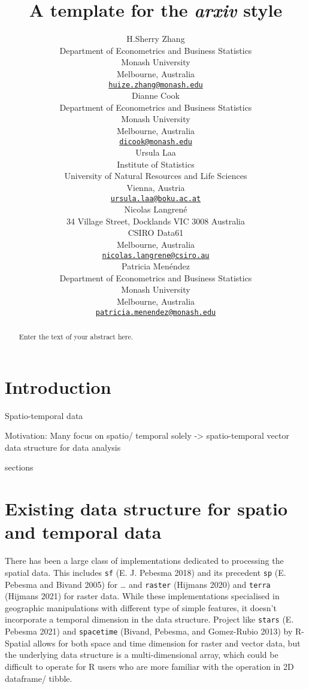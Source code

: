 \documentclass{article}
\title{A template for the \emph{arxiv} style}
\author{
    H.Sherry Zhang
   \\
    Department of Econometrics and Business Statistics \\
    Monash University \\
  Melbourne, Australia \\
  \texttt{\href{mailto:huize.zhang@monash.edu}{\nolinkurl{huize.zhang@monash.edu}}} \\
   \And
    Dianne Cook
   \\
    Department of Econometrics and Business Statistics \\
    Monash University \\
  Melbourne, Australia \\
  \texttt{\href{mailto:dicook@monash.edu}{\nolinkurl{dicook@monash.edu}}} \\
   \And
    Ursula Laa
   \\
    Institute of Statistics \\
    University of Natural Resources and Life Sciences \\
  Vienna, Austria \\
  \texttt{\href{mailto:ursula.laa@boku.ac.at}{\nolinkurl{ursula.laa@boku.ac.at}}} \\
   \And
    Nicolas Langrené
   \\
    34 Village Street, Docklands VIC 3008 Australia \\
    CSIRO Data61 \\
  Melbourne, Australia \\
  \texttt{\href{mailto:nicolas.langrene@csiro.au}{\nolinkurl{nicolas.langrene@csiro.au}}} \\
   \And
    Patricia Menéndez
   \\
    Department of Econometrics and Business Statistics \\
    Monash University \\
  Melbourne, Australia \\
  \texttt{\href{mailto:patricia.menendez@monash.edu}{\nolinkurl{patricia.menendez@monash.edu}}} \\
  }
\begin{document}
\maketitle

\def\tightlist{}


\begin{abstract}
Enter the text of your abstract here.
\end{abstract}


\hypertarget{introduction}{%
\section{Introduction}\label{introduction}}

Spatio-temporal data

Motivation: Many focus on spatio/ temporal solely -\textgreater{}
spatio-temporal vector data structure for data analysis

sections

\hypertarget{existing-data-structure-for-spatio-and-temporal-data}{%
\section{Existing data structure for spatio and temporal
data}\label{existing-data-structure-for-spatio-and-temporal-data}}

There has been a large class of implementations dedicated to processing
the spatial data. This includes \texttt{sf} (E. J. Pebesma 2018) and its
precedent \texttt{sp} (E. Pebesma and Bivand 2005) for \ldots{} and
\texttt{raster} (Hijmans 2020) and \texttt{terra} (Hijmans 2021) for
raster data. While these implementations specialised in geographic
manipulations with different type of simple features, it doesn't
incorporate a temporal dimension in the data structure. Project like
\texttt{stars} (E. Pebesma 2021) and \texttt{spacetime} (Bivand,
Pebesma, and Gomez-Rubio 2013) by R-Spatial allows for both space and
time dimension for raster and vector data, but the underlying data
structure is a multi-dimensional array, which could be difficult to
operate for R users who are more familiar with the operation in 2D
dataframe/ tibble.
\end{document}
